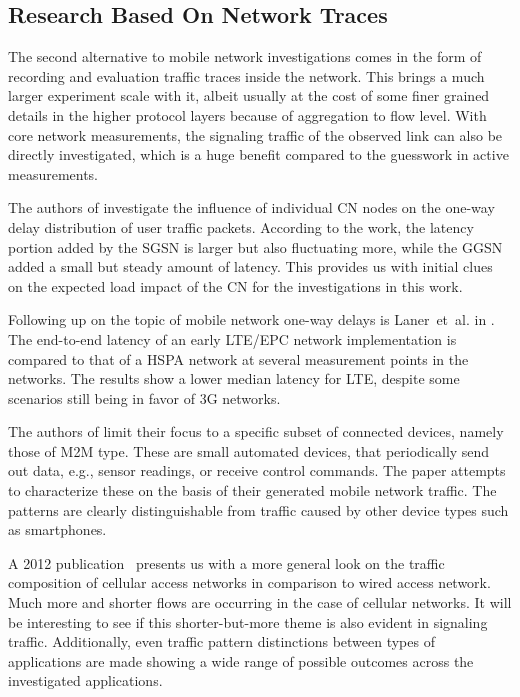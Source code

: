 \subsection{Research Based On Network Traces}

The second alternative to mobile network investigations comes in the form of recording and evaluation traffic traces inside the network. This brings a much larger experiment scale with it, albeit usually at the cost of some finer grained details in the higher protocol layers because of aggregation to flow level. With core network measurements, the signaling traffic of the observed link can also be directly investigated, which is a huge benefit compared to the guesswork in active measurements.

The authors of \cite{4675847} investigate the influence of individual \gls{CN} nodes on the one-way delay distribution of user traffic packets. According to the work, the latency portion added by the \gls{SGSN} is larger but also fluctuating more, while the \gls{GGSN} added a small but steady amount of latency. This provides us with initial clues on the expected load impact of the \gls{CN} for the investigations in this work.

Following up on the topic of mobile network one-way delays is Laner~et~al. in \cite{laner2012delaycomparison}. The end-to-end latency of an early \gls{LTE}/\gls{EPC} network implementation is compared to that of a \gls{HSPA} network at several measurement points in the networks. The results show a lower median latency for \gls{LTE}, despite some scenarios still being in favor of \gls{3G} networks.

The authors of \cite{Shafiq:2012:FLC:2254756.2254767} limit their focus to a specific subset of connected devices, namely those of \gls{M2M} type. These are small automated devices, that periodically send out data, e.g., sensor readings, or receive control commands. The paper attempts to characterize these on the basis of their generated mobile network traffic. The patterns are clearly distinguishable from traffic caused by other device types such as smartphones.

A 2012 publication~\cite{Zhang:2012:UCC:2377677.2377764} presents us with a more general look on the traffic composition of cellular access networks in comparison to wired access network. Much more and shorter flows are occurring in the case of cellular networks. It will be interesting to see if this shorter-but-more theme is also evident in signaling traffic. Additionally, even traffic pattern distinctions between types of applications are made showing a wide range of possible outcomes across the investigated applications.

